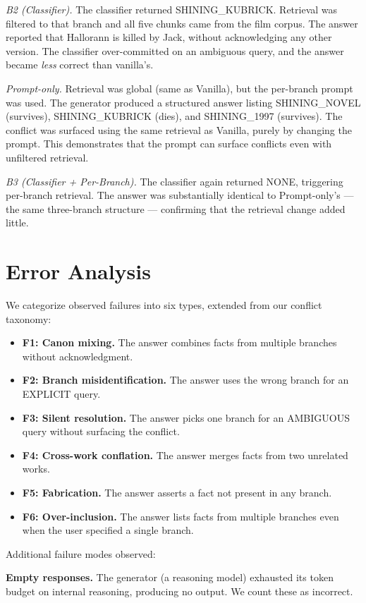 \documentclass[conference]{IEEEtran}
\begin{document}
\emph{B2 (Classifier).} The classifier returned SHINING\_KUBRICK. Retrieval was filtered to that branch and all five chunks came from the film corpus. The answer reported that Hallorann is killed by Jack, without acknowledging any other version. The classifier over-committed on an ambiguous query, and the answer became \emph{less} correct than vanilla's.

\emph{Prompt-only.} Retrieval was global (same as Vanilla), but the per-branch prompt was used. The generator produced a structured answer listing SHINING\_NOVEL (survives), SHINING\_KUBRICK (dies), and SHINING\_1997 (survives). The conflict was surfaced using the same retrieval as Vanilla, purely by changing the prompt. This demonstrates that the prompt can surface conflicts even with unfiltered retrieval.

\emph{B3 (Classifier + Per-Branch).} The classifier again returned NONE, triggering per-branch retrieval. The answer was substantially identical to Prompt-only's --- the same three-branch structure --- confirming that the retrieval change added little.

\section{Error Analysis}

We categorize observed failures into six types, extended from our conflict taxonomy:

\begin{itemize}
\item \textbf{F1: Canon mixing.} The answer combines facts from multiple branches without acknowledgment.
\item \textbf{F2: Branch misidentification.} The answer uses the wrong branch for an EXPLICIT query.
\item \textbf{F3: Silent resolution.} The answer picks one branch for an AMBIGUOUS query without surfacing the conflict.
\item \textbf{F4: Cross-work conflation.} The answer merges facts from two unrelated works.
\item \textbf{F5: Fabrication.} The answer asserts a fact not present in any branch.
\item \textbf{F6: Over-inclusion.} The answer lists facts from multiple branches even when the user specified a single branch.
\end{itemize}

Additional failure modes observed:

\textbf{Empty responses.} The generator (a reasoning model) exhausted its token budget on internal reasoning, producing no output. We count these as incorrect.
\end{document}
